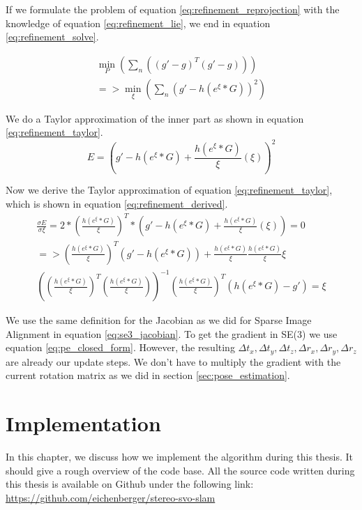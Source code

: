 \documentclass[11pt,a4paper,titlepage,oneside]{report}
\begin{document}
If we formulate the problem of equation \ref{eq:refinement_reprojection} with the knowledge of equation \ref{eq:refinement_lie}, we end in equation \ref{eq:refinement_solve}.

\begin{equation}\label{eq:refinement_solve}
  \begin{gathered}
    \min_P(\sum_n ((g'-g)^T(g'-g)))\\
    =>\min_{\xi}(\sum_n (g'-h(e^{\xi}*G))^2)
  \end{gathered}
\end{equation}

We do a Taylor approximation of the inner part as shown in equation \ref{eq:refinement_taylor}.
\begin{equation}\label{eq:refinement_taylor}
  E=(g'-h(e^{\xi}*G)+\frac{h(e^{\xi}*G)}{\xi}(\xi))^2
\end{equation}

Now we derive the Taylor approximation of equation \ref{eq:refinement_taylor}, which is shown in equation \ref{eq:refinement_derived}.
\begin{equation}\label{eq:refinement_derived}
  \begin{gathered}
    \frac{\sigma E}{\sigma \xi}=2*(\frac{h(e^{\xi}*G)}{\xi})^T*(g'-h(e^{\xi}*G)+\frac{h(e^{\xi}*G)}{\xi}(\xi))=0\\
    =>(\frac{h(e^{\xi}*G)}{\xi})^T(g'-h(e^{\xi}*G))+\frac{h(e^{\xi}*G)}{\xi}\frac{h(e^{\xi}*G)}{\xi}\xi\\
    ((\frac{h(e^{\xi}*G)}{\xi})^T(\frac{h(e^{\xi}*G)}{\xi}))^{-1}(\frac{h(e^{\xi}*G)}{\xi})^T(h(e^{\xi}*G)-g')=\xi
  \end{gathered}
\end{equation}

We use the same definition for the Jacobian as we did for Sparse Image Alignment in equation \ref{eq:se3_jacobian}. To get the gradient in SE(3) we use equation \ref{eq:pe_closed_form}. However, the resulting $\Delta t_x,\Delta t_y,\Delta t_z,\Delta r_x,\Delta r_y,\Delta r_z$ are already our update steps. We don't have to multiply the gradient with the current rotation matrix as we did in section \ref{sec:pose_estimation}.

\chapter{Implementation}\label{ch:implementation}
In this chapter, we discuss how we implement the algorithm during this thesis. It should give a rough overview of the code base. All the source code written during this thesis is available on Github under the following link:\\
\url{https://github.com/eichenberger/stereo-svo-slam}
\end{document}
